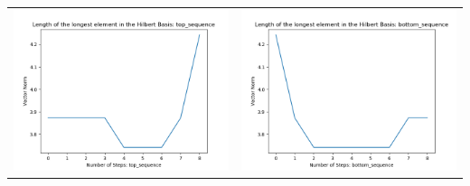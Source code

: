\documentclass[10pt]{article}
\begin{document}
\begin{tabular}{c|c}
\begin{minipage}{.4\textwidth}
\includegraphics[width=\textwidth]{"DATA/4d/4 generators 2 bound B/top_sequence LENGTH"}
\end{minipage} &
\begin{minipage}{.4\textwidth}
\includegraphics[width=\textwidth]{"DATA/4d/4 generators 2 bound B bottomup/bottom_sequence LENGTH"}
\end{minipage}
\end{tabular}
\end{document}
